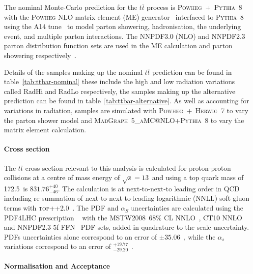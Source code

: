 The nominal Monte-Carlo prediction for the $t\bar{t}$ process is
\textsc{Powheg}~+~\textsc{Pythia}~8 with the \textsc{Powheg} NLO matrix element
(ME) generator~\cite{JHEP0709.2007.126,JHEP0411.2004.040} interfaced to
\textsc{Pythia}~8~\cite{Comp.Phys.Comm.191.159} using the A14
tune~\cite{ATL-PHYS-PUB-2014-021} to model parton showering, hadronisation,
the underlying event, and multiple parton interactions. The NNPDF3.0 (NLO) and
NNPDF2.3 parton distribution function sets are used in the ME calculation and
parton showering respectively~\cite{ATL-PHYS-PUB-2016-020}.

Details of the samples making up the nominal $t\bar{t}$ prediction can be found
in table~\ref{tab:ttbar-nominal} these include the high and low radiation
variations called  RadHi and RadLo respectively, the samples making up the
alternative prediction can be found in table~\ref{tab:ttbar-alternative}. As
well as accounting for variations in radiation, samples are simulated with
\textsc{Powheg}~+~\textsc{Herwig}~7 to vary the parton shower model and
\textsc{MadGraph}~5\textsc{\_aMC@NLO}+\textsc{Pythia}~8 to vary the matrix
element calculation. 


\paragraph{Cross section}

The $t\bar{t}$ cross section relevant to this analysis is calculated for
proton-proton collisions at a centre of mass energy of $\sqrt{s} = 13$~\TeV and
using a top quark mass of 172.5~\GeV is $831.76^{+40}_{-46}$\picobarn. The
calculation is  at next-to-next-to leading order in QCD including re-summation
of next-to-next-to-leading logarithmic (NNLL) soft gluon terms with
\textsc{top++2.0}~\cite{Beneke2012695,Cacciari2012612,PhysRevLett.109.132001,NNLOcorr,NNLOcorrNLO,PhysRevLett.110.252004,Czakon:2011xx}.
The PDF and $\alpha_S$ uncertainties are calculated using the PDF4LHC
prescription ~\cite{Botje:2011sn} with the MSTW2008~68\% CL
NNLO~\cite{PDFLHC,alphasunc}, CT10
NNLO~\cite{PhysRevD.82.074024,PhysRevD.89.033009} and NNPDF2.3 5f
FFN~\cite{Ball:2012cx} PDF sets, added in quadrature to the scale uncertainty.
PDFs uncertainties alone correspond to an error of $\pm 35.06$~\picobarn, while
the $\alpha_s$ variations correspond to an error of
$^{+19.77}_{-29.20}$~\picobarn.

\paragraph{Normalisation and Acceptance}

